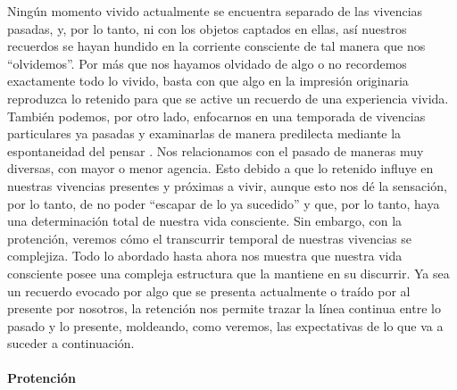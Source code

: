Ningún momento vivido actualmente se encuentra separado de las vivencias
pasadas, y, por lo tanto, ni con los objetos captados en ellas, así
nuestros recuerdos se hayan hundido en la corriente consciente de tal
manera que nos ``olvidemos''. Por más que nos hayamos olvidado de algo o
no recordemos exactamente todo lo vivido, basta con que algo en la
impresión originaria reproduzca lo retenido para que se active un
recuerdo de una experiencia vivida. También podemos, por otro lado,
enfocarnos en una temporada de vivencias particulares ya pasadas y
examinarlas de manera predilecta mediante la espontaneidad del pensar
\cite[§15, p.~59]{husserl2002}. Nos relacionamos con el pasado de maneras muy
diversas, con mayor o menor agencia. Esto debido a que lo retenido
influye en nuestras vivencias presentes y próximas a vivir, aunque esto
nos dé la sensación, por lo tanto, de no poder ``escapar de lo ya
sucedido'' y que, por lo tanto, haya una determinación total de nuestra
vida consciente. Sin embargo, con la protención, veremos cómo el
transcurrir temporal de nuestras vivencias se complejiza. Todo lo
abordado hasta ahora nos muestra que nuestra vida consciente posee una
compleja estructura que la mantiene en su discurrir. Ya sea un recuerdo
evocado por algo que se presenta actualmente o traído por al presente
por nosotros, la retención nos permite trazar la línea continua entre lo
pasado y lo presente, moldeando, como veremos, las expectativas de lo
que va a suceder a continuación.

\paragraph{Protención}

